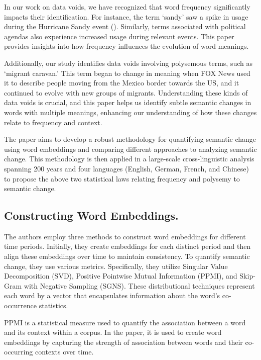 In our work on data voids, we have recognized that word frequency significantly impacts their identification.
For instance, the term `sandy' saw a spike in usage during the Hurricane Sandy event ().
Similarly, terms associated with political agendas also experience increased usage during relevant events.
This paper provides insights into how frequency influences the evolution of word meanings.

Additionally, our study identifies data voids involving polysemous terms, such as `migrant caravan.'
This term began to change in meaning when FOX News used it to describe people moving from the Mexico border towards the US, and it continued to evolve with new groups of migrants.
Understanding these kinds of data voids is crucial, and this paper helps us identify subtle semantic changes in words with multiple meanings,
enhancing our understanding of how these changes relate to frequency and context.

The paper aims to develop a robust methodology for quantifying semantic change using word embeddings and comparing different approaches to analyzing semantic change.
This methodology is then applied in a large-scale cross-linguistic analysis spanning 200 years and four languages
(English, German, French, and Chinese) to propose the above two statistical laws relating frequency and polysemy to semantic change.

\subsection{Constructing Word Embeddings.}\label{subsec:constructing-word-embeddings}
The authors employ three methods to construct word embeddings for different time periods.
Initially, they create embeddings for each distinct period and then align these embeddings over time to maintain consistency.
To quantify semantic change, they use various metrics.
Specifically, they utilize Singular Value Decomposition (SVD), Positive Pointwise Mutual Information (PPMI), and Skip-Gram with Negative Sampling (SGNS).
These distributional techniques represent each word by a vector that encapsulates information about the word’s co-occurrence statistics.

PPMI is a statistical measure used to quantify the association between a word and its context within a corpus.
In the paper, it is used to create word embeddings by capturing the strength of association between words and their co-occurring contexts over time.


